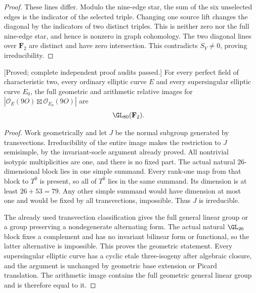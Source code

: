 \begin{proof}
These lines differ. Modulo the nine-edge star, the sum of
the six unselected edges is the indicator of the selected
triple. Changing one source lift changes the diagonal by
the indicators of two distinct triples. This is neither
zero nor the full nine-edge star, and hence is nonzero in
graph cohomology. The two diagonal lines over $\mathbf F_2$
are distinct and have zero intersection. This contradicts
$S_Y\ne0$, proving irreducibility.
\end{proof}

\begin{theorem}
\label{thm:mixed-every-fixed-modulus-degree-three-candidate}
\textup{[Proved; complete independent proof audits passed.]}
For every perfect field of characteristic two, every ordinary
elliptic curve $E$ and every supersingular elliptic curve $E_0$,
the full geometric and arithmetic relative images for
$|\mathcal O_E(9O)\boxtimes\mathcal O_{E_0}(9O)|$ are
\[
                         \GL_{80}(\mathbf F_2).
\]
\end{theorem}
\begin{proof}
Work geometrically and let $J$ be the normal subgroup generated
by transvections. Irreducibility of the entire image makes
the restriction to $J$ semisimple, by the invariant-socle
argument already proved. All nontrivial isotypic multiplicities
are one, and there is no fixed part. The actual natural
$26$-dimensional block lies in one simple summand. Every
rank-one map from that block to $T^0$ is present, so all of
$T^0$ lies in the same summand. Its dimension is at least
$26+53=79$. Any other simple summand would have dimension at
most one and would be fixed by all transvections, impossible.
Thus $J$ is irreducible.

The already used transvection classification
\cite[Theorem~3.6, printed p.~22]{KantorSeress2001} gives the
full general linear group or a group preserving a nondegenerate
alternating form. The actual natural $\GL_{26}$ block fixes
a complement and has no invariant bilinear form or functional,
so the latter alternative is impossible. This proves the
geometric statement. Every supersingular elliptic curve has
a cyclic etale three-isogeny after algebraic closure, and
the argument is unchanged by geometric base extension or
Picard translation. The arithmetic image contains the full
geometric general linear group and is therefore equal to it.
\end{proof}

